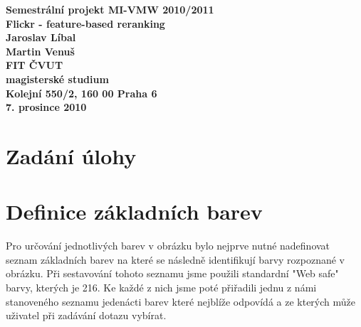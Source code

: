 \documentclass[12pt]{article}
\author{Martin Venuš, Jaroslav Líbal}
\begin{document}

\begin{center}
\bf Semestrální projekt MI-VMW 2010/2011\\[5mm]
    Flickr - feature-based reranking\\[5mm]
       Jaroslav Líbal\\
       Martin Venuš\\[5mm]
FIT ČVUT\\[2mm]
magisterské studium\\[2mm]
Kolejní 550/2, 160 00 Praha 6\\[2mm]
7. prosince 2010
\end{center}

\newpage
\tableofcontents
\newpage
\pagestyle{fancy}

\section{Zadání úlohy}

\section{Definice základních barev}
Pro určování jednotlivých barev v obrázku bylo nejprve nutné nadefinovat seznam základních barev na které se následně identifikují barvy rozpoznané v obrázku. Při sestavování tohoto seznamu jsme použili standardní "Web safe" barvy, kterých je 216. Ke každé z nich jsme poté přiřadili jednu z námi stanoveného seznamu jedenácti barev které nejblíže odpovídá a ze kterých může uživatel při zadávání dotazu vybírat.
\end{document}
